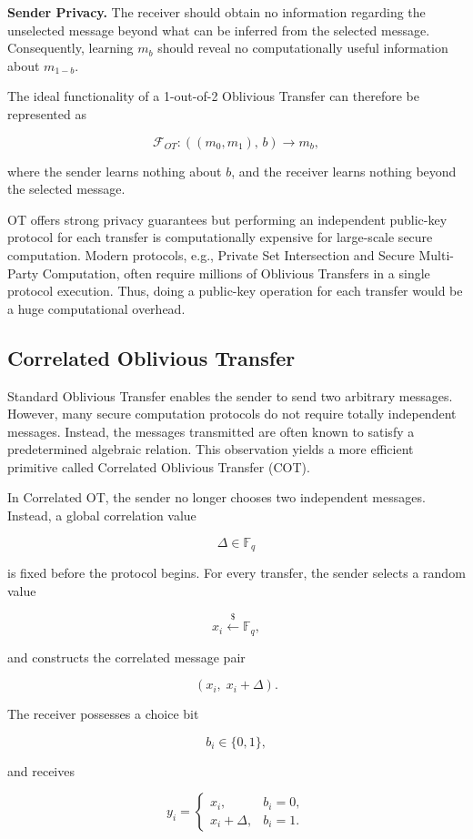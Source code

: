 \documentclass[11pt,a4paper]{article}
\begin{document}
\textbf{Sender Privacy.}
The receiver should obtain no information regarding the unselected message beyond what can be inferred from the selected message. Consequently, learning $m_b$ should reveal no computationally useful information about $m_{1-b}$.

The ideal functionality of a 1-out-of-2 Oblivious Transfer can therefore be represented as

\[
\mathcal{F}_{OT}:
\left(
(m_0,m_1),\,b
\right)
\rightarrow
m_b,
\]

where the sender learns nothing about $b$, and the receiver learns nothing beyond the selected message.

OT offers strong privacy guarantees but performing an independent public-key protocol for each transfer is computationally expensive for large-scale secure computation. Modern protocols, e.g., Private Set Intersection and Secure Multi-Party Computation, often require millions of Oblivious Transfers in a single protocol execution. Thus, doing a public-key operation for each transfer would be a huge computational overhead.


\subsection{Correlated Oblivious Transfer}

Standard Oblivious Transfer enables the sender to send two arbitrary messages. However, many secure computation protocols do not require totally independent messages. Instead, the messages transmitted are often known to satisfy a predetermined algebraic relation. This observation yields a more efficient primitive called Correlated Oblivious Transfer (COT).

In Correlated OT, the sender no longer chooses two independent messages. Instead, a global correlation value

\[
\Delta \in \mathbb{F}_q
\]

is fixed before the protocol begins. For every transfer, the sender selects a random value

\[
x_i
\xleftarrow{\$}
\mathbb{F}_q,
\]

and constructs the correlated message pair

\[
(x_i,\;x_i+\Delta).
\]

The receiver possesses a choice bit

\[
b_i\in\{0,1\},
\]

and receives

\[
y_i=
\begin{cases}
x_i, & b_i=0,\\[1ex]
x_i+\Delta,& b_i=1.
\end{cases}
\]
\end{document}
